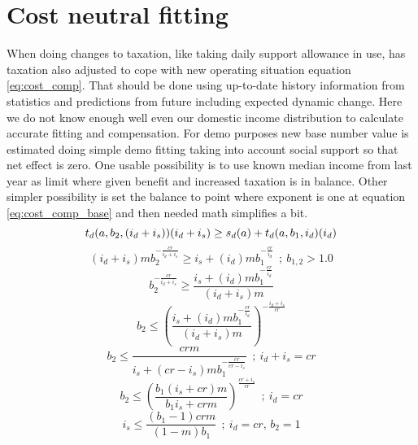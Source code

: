 \section{Cost neutral fitting}
\label{cost_neutral_fitting}
When doing changes to taxation, like taking daily support allowance in use,
has taxation also adjusted to cope with new operating situation equation \ref{eq:cost_comp}.
That should be done using up-to-date history information from statistics
and predictions from future including expected dynamic change.
Here we do not know enough well even our domestic income distribution to calculate accurate fitting and compensation.
For demo purposes new base number value is estimated doing simple demo fitting taking into account social support so that net effect is zero.
One usable possibility is to use known median income from last year as limit where given benefit and increased taxation is in balance.
Other simpler possibility is set the balance to point where exponent is one at equation
\ref{eq:cost_comp_base} and then needed math simplifies a bit.
\begin{equation} \label{eq:cost_comp} \index{compensation}
t_d(a,b_2,(i_d+i_s))(i_d+i_s) \geq s_d(a)+t_d(a,b_1,i_d)(i_d)
\end{equation}
\begin{equation} \label{eq:cost_comp_1}
(i_d+i_s)m b_2^{-\frac{cr}{i_d+i_s}}\geq i_s+(i_d) m b_1^{-\frac{cr}{i_d}}
~~;~ b_{1,2} > 1.0
\end{equation}
\begin{equation} \label{eq:cost_comp_2}
b_2^{-\frac{cr}{i_d+i_s}}\geq\frac{i_s+(i_d)m b_1^{-\frac{cr}{i_d}}}{(i_d+i_s)m}
\end{equation}
\begin{equation} \label{eq:cost_comp_base}
b_2\leq\left(\frac{i_s+(i_d)m b_1^{-\frac{cr}{i_d}}}{(i_d+i_s)m}\right)^{-\frac{i_d+i_s}{cr}}
\end{equation}
\begin{equation} \label{eq:cost_comp_base_cridis}
b_2\leq\frac{crm}{i_s+(cr-i_s)m b_1^{-\frac{cr}{cr-i_s}}}~~;~i_d+i_s=cr
\end{equation}
\begin{equation} \label{eq:cost_comp_base_crid}
b_2\leq\left(\frac{b_1(i_s+cr)m}{b_1i_s+crm}\right)^\frac{cr+i_s}{cr}~~;~i_d=cr
\end{equation}
\begin{equation} \label{eq:cost_comp_is_b2_1}
i_s\leq\frac{(b_1-1)crm}{(1-m)b_1}~~;~i_d=cr,\,b_2=1
\end{equation}

